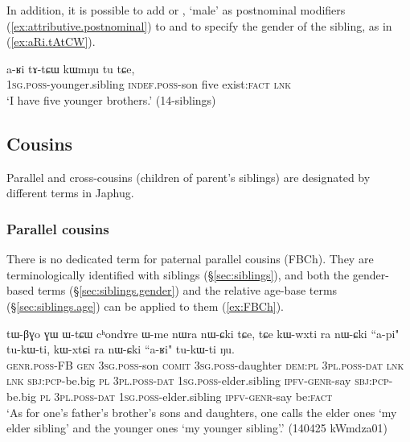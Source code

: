 In addition, it is possible to add  or , `male' as postnominal modifiers (\ref{ex:attributive.postnominal}) to  and  to specify the gender of the sibling, as in (\ref{ex:aRi.tAtCW}).

\begin{exe}
	\ex \label{ex:aRi.tAtCW}
	\gll a-ʁi tɤ-tɕɯ kɯmŋu tu tɕe, \\
	\textsc{1sg}.\textsc{poss}-younger.sibling \textsc{indef}.\textsc{poss}-son five exist:\textsc{fact} \textsc{lnk} \\
	\glt `I have five younger brothers.' (14-siblings) 
\end{exe}

  
                   
\subsection{Cousins} \label{sec:ego.cousins}
Parallel and cross-cousins (children of parent's siblings) are designated by different terms in Japhug.

\subsubsection{Parallel cousins} \label{sec:ego.parallel.cousins}
There is no dedicated term for paternal parallel cousins (FBCh). They are terminologically identified with siblings (§\ref{sec:siblings}), and both the gender-based terms (§\ref{sec:siblings.gender}) and the relative age-base terms (§\ref{sec:siblings.age}) can be applied to them (\ref{ex:FBCh}).

\begin{exe}
\ex \label{ex:FBCh}
\gll  tɯ-βɣo ɣɯ ɯ-tɕɯ cʰondɤre ɯ-me nɯra nɯ-ɕki tɕe, tɕe kɯ-wxti ra nɯ-ɕki ``a-pi" tu-kɯ-ti, kɯ-xtɕi ra nɯ-ɕki ``a-ʁi" tu-kɯ-ti ŋu. \\
\textsc{genr}.\textsc{poss}-FB \textsc{gen} \textsc{3sg}.\textsc{poss}-son \textsc{comit}  \textsc{3sg}.\textsc{poss}-daughter \textsc{dem}:\textsc{pl} \textsc{3pl}.\textsc{poss}-\textsc{dat} \textsc{lnk} \textsc{lnk} \textsc{sbj}:\textsc{pcp}-be.big \textsc{pl} \textsc{3pl}.\textsc{poss}-\textsc{dat} \textsc{1sg}.\textsc{poss}-elder.sibling \textsc{ipfv}-\textsc{genr}-say \textsc{sbj}:\textsc{pcp}-be.big \textsc{pl} \textsc{3pl}.\textsc{poss}-\textsc{dat} \textsc{1sg}.\textsc{poss}-elder.sibling \textsc{ipfv}-\textsc{genr}-say be:\textsc{fact} \\
\glt `As for one's father's brother's sons and daughters, one calls the elder ones  `my elder sibling' and the younger ones  `my younger sibling'.' (140425 kWmdza01)
\end{exe}

